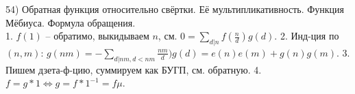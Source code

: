 54) Обратная функция относительно свёртки. Её мультипликативность. Функция Мёбиуса. Формула обращения.\\
1. $f(1)$ -- обратимо, выкидываем $n$, см. $0=\sum_{d|n}f(\frac{n}{d})g(d)$. 2. Инд-ция по $(n, m)$: $g(nm)=-\sum_{d|nm, d<nm}\frac{nm}{d})g(d)=e(n)e(m)+g(n)g(m)$. 3. Пишем дзета-ф-цию, суммируем как БУГП, см. обратную. 4. $f=g*1 \Leftrightarrow g=f*1^{-1}=f\mu$.\\

